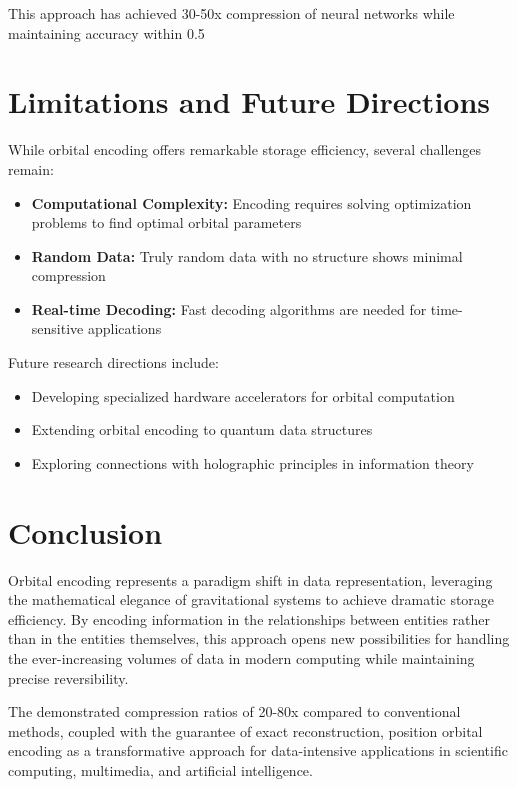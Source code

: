 This approach has achieved 30-50x compression of neural networks while maintaining accuracy within 0.5%

\section{Limitations and Future Directions}

While orbital encoding offers remarkable storage efficiency, several challenges remain:

\begin{itemize}
    \item \textbf{Computational Complexity:} Encoding requires solving optimization problems to find optimal orbital parameters
    \item \textbf{Random Data:} Truly random data with no structure shows minimal compression
    \item \textbf{Real-time Decoding:} Fast decoding algorithms are needed for time-sensitive applications
\end{itemize}

Future research directions include:

\begin{itemize}
    \item Developing specialized hardware accelerators for orbital computation
    \item Extending orbital encoding to quantum data structures
    \item Exploring connections with holographic principles in information theory
\end{itemize}

\section{Conclusion}

Orbital encoding represents a paradigm shift in data representation, leveraging the mathematical elegance of gravitational systems to achieve dramatic storage efficiency. By encoding information in the relationships between entities rather than in the entities themselves, this approach opens new possibilities for handling the ever-increasing volumes of data in modern computing while maintaining precise reversibility.

The demonstrated compression ratios of 20-80x compared to conventional methods, coupled with the guarantee of exact reconstruction, position orbital encoding as a transformative approach for data-intensive applications in scientific computing, multimedia, and artificial intelligence.